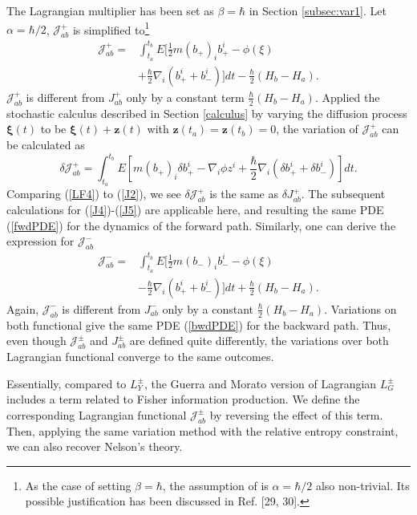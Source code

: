 \documentclass[%
 aip, 
 amsmath,amssymb,amsthm,
 nofootinbib,
 reprint,
]{revtex4-1}
\begin{document}
The Lagrangian multiplier has been set as $\beta=\hbar$ in Section \ref{subsec:var1}. Let $\alpha=\hbar/2$, $\mathcal{J}_{ab}^+$ is simplified to\footnote{As the case of setting $\beta=\hbar$, the assumption of is $\alpha=\hbar/2$ also non-trivial. Its possible justification has been discussed in Ref. [29, 30].}
\begin{equation}
    \begin{split}
    \mathcal{J}_{ab}^+ =& \int_{t_a}^{t_b} E[\frac{1}{2}m(b_+)_ib_+^i - \phi(\xi)  \\ 
    & +\frac{\hbar}{2}\nabla_i(b_+^i + b_-^i)]dt
    -\frac{\hbar}{2}(H_b - H_a).
    \end{split}
\end{equation}
$\mathcal{J}_{ab}^+$ is different from $J_{ab}^+$ only by a constant term $\frac{\hbar}{2}(H_b - H_a)$. Applied the stochastic calculus described in Section \ref{calculus} by varying the diffusion process $\mathbf{\xi}(t)$ to be $\mathbf{\xi}(t)+\mathbf{z}(t)$ with $\mathbf{z}(t_a)=\mathbf{z}(t_b)=0$, the variation of $\mathcal{J}_{ab}^+$ can be calculated as
\begin{equation}
    \label{LF4}
    \delta\mathcal{J}_{ab}^+ = \int_{t_a}^{t_b} E[m(b_+)_i\delta b_+^i - \nabla_i\phi z^i + \frac{\hbar}{2}\nabla_i(\delta b_+^i + \delta b_-^i )]dt.
\end{equation}
Comparing (\ref{LF4}) to (\ref{J2}), we see $\delta\mathcal{J}_{ab}^+$ is the same as $\delta J_{ab}^+$. The subsequent calculations for (\ref{J4})-(\ref{J5}) are applicable here, and resulting the same PDE (\ref{fwdPDE}) for the dynamics of the forward path. Similarly, one can derive the expression for $\mathcal{J}_{ab}^-$
\begin{equation}
    \begin{split}
    \mathcal{J}_{ab}^- =& \int_{t_a}^{t_b} E[\frac{1}{2}m(b_-)_ib_-^i - \phi(\xi) \\ 
    & -\frac{\hbar}{2}\nabla_i(b_+^i + b_-^i)]dt
     +\frac{\hbar}{2}(H_b - H_a).
    \end{split}
\end{equation}
Again, $\mathcal{J}_{ab}^-$ is different from $J_{ab}^-$ only by a constant $\frac{\hbar}{2}(H_b - H_a)$. Variations on both functional give the same PDE (\ref{bwdPDE}) for the backward path. Thus, even though $\mathcal{J}_{ab}^{\pm}$ and $J_{ab}^{\pm}$ are defined quite differently, the variations over both Lagrangian functional converge to the same outcomes.

Essentially, compared to $L_Y^{\pm}$, the Guerra and Morato version of Lagrangian $L_G^{\pm}$ includes a term related to Fisher information production. We define the corresponding Lagrangian functional $\mathcal{J}_{ab}^{\pm}$ by reversing the effect of this term. Then, applying the same variation method with the relative entropy constraint, we can also recover Nelson's theory.
\end{document}
